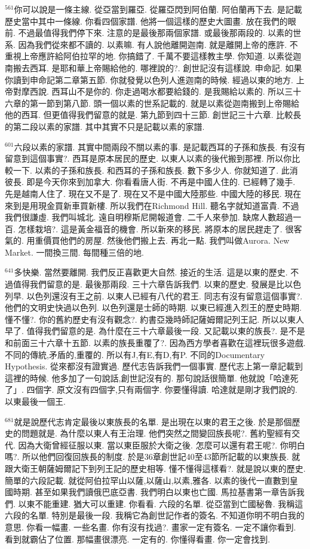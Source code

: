 \documentclass{book}
\begin{document}
$^{561}$你可以說是一條主線.
從亞當到羅亞.
從羅亞閃到阿伯蘭.
阿伯蘭再下去.
是記載歷史當中其中一條線.
你看四個家譜.
他將一個這樣的歷史大圖畫.
放在我們的眼前.
不過最值得我們停下來.
注意的是最後那兩個家譜.
或最後那兩段的.
以素的世系.
因為我們從來都不讀的.
以素嘛.
有人說他離開迦南.
就是離開上帝的應許.
不重視上帝應許給阿伯拉罕的地.
你搞錯了.
千萬不要這樣教主學.
你知道.
以素從迦南搬去西耳.
是耶和華上帝賜給他的.
哪裡說的?.
創世記沒有這樣說.
申命記.
如果你讀到申命記第二章第五節.
你就發覺以色列人進迦南的時候.
經過以東的地方.
上帝對摩西說.
西耳山不是你的.
你走過喝水都要給錢的.
是我賜給以素的.
所以三十六章的第一節到第八節.
頭一個以素的世系記載的.
就是以素從迦南搬到上帝賜給他的西耳.
但更值得我們留意的就是.
第九節到四十三節.
創世記三十六章.
比較長的第二段以素的家譜.
其中其實不只是記載以素的家譜.

$^{601}$六段以素的家譜.
其實中間兩段不關以素的事.
是記載西耳的子孫和族長.
有沒有留意到這個事實?.
西耳是原本居民的歷史.
以東人以素的後代搬到那裡.
所以你比較一下.
以素的子孫和族長.
和西耳的子孫和族長.
數下多少人.
你就知道了.
此消彼長.
即是今天你來到加拿大.
你看看唐人街.
不再是中國人住的.
已經轉了幾手.
先是越南人住了.
現在又不是了.
現在又不是中國大陸那些.
中國大陸的移民.
現在來到是用現金買新車買新樓.
所以我們在Richmond Hill.
聽名字就知道富貴.
不過我們很謙虛.
我們叫城北.
遠自明穆斯尼開報道會.
二千人來參加.
缺席人數超過一百.
怎樣栽培?.
這是黃金福音的機會.
所以新來的移民.
將原本的居民趕走了.
很客氣的.
用重價買他們的房屋.
然後他們搬上去.
再北一點.
我們叫做Aurora.
New Market.
一間換三間.
每間種三倍的地.

$^{641}$多快樂.
當然要離開.
我們反正喜歡更大自然.
接近的生活.
這是以東的歷史.
不過值得我們留意的是.
最後那兩段.
三十六章告訴我們.
以東的歷史.
發展是比以色列早.
以色列還沒有王之前.
以東人已經有八代的君王.
同志有沒有留意這個事實?.
他們的文明史快過以色列.
以色列還是士師的時期.
以東已經進入烈王的歷史時期.
懂不懂?.
你的舊約歷史有沒有觀念?.
約書亞幾時師記薩姆爾記列王記.
所以以東人早了.
值得我們留意的是.
為什麼在三十六章最後一段.
又記載以東的族長?.
是不是和前面三十六章十五節.
以素的族長重覆了?.
因為西方學者喜歡在這裡玩很多遊戲.
不同的傳統,矛盾的,重覆的.
所以有J,有E,有D,有P.
不同的Documentary Hypothesis.
從來都沒有證實過.
歷代志告訴我們一個事實.
歷代志上第一章記載到這裡的時候.
他多加了一句說話,創世記沒有的.
那句說話很簡單.
他就說「哈達死了」.
四個字.
原文沒有四個字,只有兩個字.
你要懂得讀.
哈達就是剛才我們說的.
以東最後一個王.

$^{681}$就是說歷代志肯定最後以東族長的名單.
是出現在以東的君王之後.
於是那個歷史的問題就是.
為什麼以東人有王治理.
他們突然之間變回族長呢?.
舊約聖經有交代.
因為大衛曾經征服以東.
當以東臣服於大衛之後.
怎麼可以還有君王呢?.
你明白嗎?.
所以他們回復回族長的制度.
於是36章創世記40至43節所記載的以東族長.
就跟大衛王朝薩姆爾記下到列王記的歷史相等.
懂不懂得這樣看?.
就是說以東的歷史.
簡單的六段記載.
就從阿伯拉罕山以薩,以薩山,以素,雅各.
以素的後代一直數到皇國時期.
甚至如果我們讀俄巴底亞書.
我們明白以東也亡國.
馬拉基書第一章告訴我們.
以東不能重建.
猶大可以重建.
你看看.
六段的名單.
從亞當到亡國秘魯.
我稱這六段的名單.
特別是最後一段.
我稱它為創世記作者的簽名.
不知道你明不明白我的意思.
你看一幅畫.
一些名畫.
你有沒有找過?.
畫家一定有簽名.
一定不讓你看到.
看到就霸佔了位置.
那幅畫很漂亮.
一定有的.
你懂得看畫.
你一定會找到.
\end{document}
